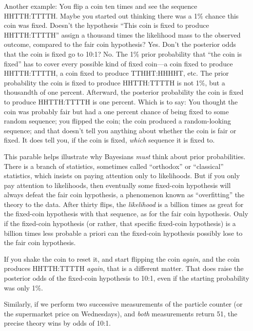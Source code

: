 {
 Another example: You flip a coin ten times and see the sequence
HHTTH:TTTTH. Maybe you started out thinking there was a 1\% chance this
coin was fixed. Doesn't the hypothesis
``This coin is fixed to produce
HHTTH:TTTTH'' assign a thousand times the likelihood
mass to the observed outcome, compared to the fair coin hypothesis?
Yes. Don't the posterior odds that the coin is fixed go
to 10:1? No. The 1\% prior probability that ``the coin
is fixed'' has to cover every possible kind of fixed
coin---a coin fixed to produce HHTTH:TTTTH, a coin fixed to produce
TTHHT:HHHHT, etc. The prior probability the coin is fixed to produce
HHTTH:TTTTH is not 1\%, but a thousandth of one percent. Afterward, the
posterior probability the coin is fixed to produce HHTTH:TTTTH is one
percent. Which is to say: You thought the coin was probably fair but
had a one percent chance of being fixed to some random sequence; you
flipped the coin; the coin produced a random-looking sequence; and that
doesn't tell you anything about whether the coin is
fair or fixed. It does tell you, if the coin is fixed, \textit{which}
sequence it is fixed to.}

{
 This parable helps illustrate why Bayesians \textit{must} think
about prior probabilities. There is a branch of statistics, sometimes
called ``orthodox'' or
``classical'' statistics, which
insists on paying attention only to likelihoods. But if you only pay
attention to likelihoods, then eventually some fixed-coin hypothesis
will always defeat the fair coin hypothesis, a phenomenon known as
``overfitting'' the theory to the
data. After thirty flips, the \textit{likelihood} is a billion times as
great for the fixed-coin hypothesis with that sequence, as for the fair
coin hypothesis. Only if the fixed-coin hypothesis (or rather, that
specific fixed-coin hypothesis) is a billion times less probable a
priori can the fixed-coin hypothesis possibly lose to the fair coin
hypothesis.}

{
 If you shake the coin to reset it, and start flipping the coin
\textit{again}, and the coin produces HHTTH:TTTTH \textit{again}, that
is a different matter. That does raise the posterior odds of the
fixed-coin hypothesis to 10:1, even if the starting probability was
only 1\%.}

{
 Similarly, if we perform two successive measurements of the
particle counter (or the supermarket price on Wednesdays), and
\textit{both} measurements return 51, the precise theory wins by odds
of 10:1.}

